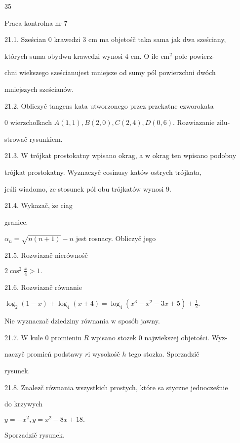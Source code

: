 \documentclass[a4paper,12pt]{article}
\begin{document}
35

Praca kontrolna nr 7

21.1. Sześcian $0$ krawedzi 3 cm ma objetośč taka sama jak dwa sześciany,

których suma obydwu krawedzi wynosi 4 cm. $\mathrm{O}$ ile $\mathrm{c}\mathrm{m}^{2}$ pole powierz-

chni wiekszego sześcianujest mniejsze od sumy pól powierzchni dwóch

mniejszych sześcianów.

21.2. Obliczyč tangens kata utworzonego przez przekatne czworokata

$0$ wierzcholkach $A(1,1), B(2,0), C(2,4), D(0,6)$. Rozwiazanie zilu-

strowač rysunkiem.

21.3. $\mathrm{W}$ trójkat prostokatny wpisano okrag, a $\mathrm{w}$ okrag ten wpisano podobny

trójkat prostokatny. Wyznaczyč cosinusy katów ostrych trójkata,

jeśli wiadomo, $\dot{\mathrm{z}}\mathrm{e}$ stosunek pól obu trójkatów wynosi 9.

21.4. Wykazač, $\dot{\mathrm{z}}\mathrm{e}$ ciag

granice.

$\alpha_{n}=\sqrt{n(n+1)}-n$ jest rosnacy. Obliczyč jego

21.5. Rozwiazač nierównośč

$2\displaystyle \cos^{2}\frac{x}{4}>1.$

21.6. Rozwiazač równanie

$\displaystyle \log_{2}(1-x)+\log_{4}(x+4)=\log_{4}(x^{3}-x^{2}-3x+5)+\frac{1}{2}.$

Nie wyznaczač dziedziny równania $\mathrm{w}$ sposób jawny.

21.7. $\mathrm{W}$ kule $0$ promieniu $R$ wpisano stozek $0$ najwiekszej objetości. Wyz-

naczyč promień podstawy $r \mathrm{i}$ wysokośč $h$ tego stozka. Sporzadzič

rysunek.

21.8. Znalez$\acute{}$č równania wszystkich prostych, które sa styczne jednocześnie

do krzywych

$y=-x^{2},y=x^{2}-8x+18.$

Sporzadzič rysunek.
\end{document}
